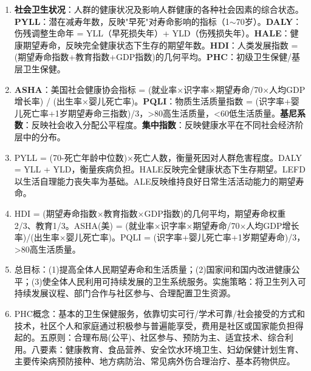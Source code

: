 \begin{enumerate}[leftmargin=*, itemsep=5pt]
    \item \textbf{社会卫生状况}：人群的健康状况及影响人群健康的各种社会因素的综合状态。\textbf{PYLL}：潜在减寿年数，反映"早死"对寿命影响的指标（1$\sim$70岁）。\textbf{DALY}：伤残调整生命年 = YLL（早死损失年）+ YLD（伤残损失年）。\textbf{HALE}：健康期望寿命，反映完全健康状态下生存的期望年数。\textbf{HDI}：人类发展指数 = (期望寿命指数+教育指数+GDP指数)的几何平均。\textbf{PHC}：初级卫生保健/基层卫生保健。
    \item \textbf{ASHA}：美国社会健康协会指标 = (就业率×识字率×期望寿命/70×人均GDP增长率) / (出生率×婴儿死亡率)。\textbf{PQLI}：物质生活质量指数 = (识字率+婴儿死亡率+1岁期望寿命三指数)/3，>80高生活质量，<60低生活质量。\textbf{基尼系数}：反映社会收入分配公平程度。\textbf{集中指数}：反映健康水平在不同社会经济阶层中的分布。
    \item PYLL = (70-死亡年龄中位数)×死亡人数，衡量死因对人群危害程度。DALY = YLL + YLD，衡量疾病负担。HALE反映完全健康状态下生存期望。LEFD以生活自理能力丧失率为基础。ALE反映维持良好日常生活活动能力的期望寿命。
    \item HDI = (期望寿命指数×教育指数×GDP指数)的几何平均，期望寿命权重2/3、教育1/3。ASHA(美) = (就业率×识字率×期望寿命/70×人均GDP增长率)/(出生率×婴儿死亡率)。PQLI = (识字率+婴儿死亡率+1岁期望寿命)/3，>80高生活质量。
    \item 总目标：(1)提高全体人民期望寿命和生活质量；(2)国家间和国内改进健康公平；(3)使全体人民利用可持续发展的卫生系统服务。实施策略：将卫生列入可持续发展议程、部门合作与社区参与、合理配置卫生资源。
    \item PHC概念：基本的卫生保健服务，依靠切实可行/学术可靠/社会接受的方式和技术，社区个人和家庭通过积极参与普遍能享受，费用是社区或国家能负担得起的。五原则：合理布局(公平)、社区参与、预防为主、适宜技术、综合利用。八要素：健康教育、食品营养、安全饮水环境卫生、妇幼保健计划生育、主要传染病预防接种、地方病防治、常见病外伤合理治疗、基本药物供应。
\end{enumerate}

\newpage
